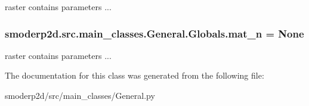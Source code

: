 raster contains parameters ... 

\hypertarget{classsmoderp2d_1_1src_1_1main__classes_1_1General_1_1Globals_a5e657e5a7569cc4bcb1be595e5a16278}{
\subsubsection[{mat\-\_\-n}]{\setlength{\rightskip}{0pt plus 5cm}smoderp2d.\-src.\-main\-\_\-classes.\-General.\-Globals.\-mat\-\_\-n = None\hspace{0.3cm}{\ttfamily [static]}}}\label{classsmoderp2d_1_1src_1_1main__classes_1_1General_1_1Globals_a5e657e5a7569cc4bcb1be595e5a16278}


raster contains parameters ... 



The documentation for this class was generated from the following file\-:\begin{DoxyCompactItemize}
\item 
smoderp2d/src/main\-\_\-classes/General.\-py\end{DoxyCompactItemize}
